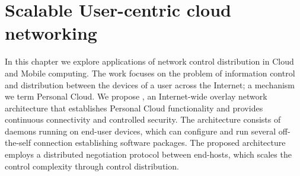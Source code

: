 \chapter{Scalable User-centric cloud networking}
\ifpdf
    \graphicspath{{Chapter3/Chapter3Figs/PNG/}{Chapter3/Chapter3Figs/PDF/}{Chapter3/Chapter3Figs/}}
\else
    \graphicspath{{Chapter3/Chapter3Figs/EPS/}{Chapter3/Chapter3Figs/}}
\fi


In this chapter we explore applications of network control distribution in Cloud and
Mobile computing. The work focuses on the problem of information control and
distribution between the devices of a user across the Internet; a mechanism we
term Personal Cloud.  We propose \signpost, an Internet-wide overlay network architecture
that establishes Personal Cloud functionality and provides continuous connectivity
and controlled security. The architecture consists of daemons running on
end-user devices, which can configure and run several off-the-self connection
establishing software packages.  The proposed architecture employs a distributed
negotiation protocol between end-hosts, which scales the control complexity
through control distribution.


